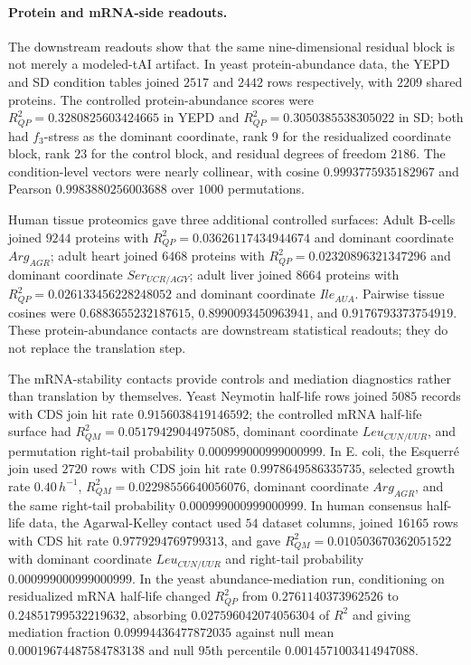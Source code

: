 \paragraph{Protein and mRNA-side readouts.}
The downstream readouts show that the same nine-dimensional residual block is not merely a modeled-tAI artifact.  In yeast protein-abundance data, the YEPD and SD condition tables joined $2517$ and $2442$ rows respectively, with $2209$ shared proteins.  The controlled protein-abundance scores were $R^2_{QP}=0.3280825603424665$ in YEPD and $R^2_{QP}=0.3050385538305022$ in SD; both had $f_3$-stress as the dominant coordinate, rank $9$ for the residualized coordinate block, rank $23$ for the control block, and residual degrees of freedom $2186$.  The condition-level vectors were nearly collinear, with cosine $0.9993775935182967$ and Pearson $0.9983880256003688$ over $1000$ permutations.

Human tissue proteomics gave three additional controlled surfaces: Adult B-cells joined $9244$ proteins with $R^2_{QP}=0.03626117434944674$ and dominant coordinate $Arg_{AGR}$; adult heart joined $6468$ proteins with $R^2_{QP}=0.02320896321347296$ and dominant coordinate $Ser_{UCR/AGY}$; adult liver joined $8664$ proteins with $R^2_{QP}=0.026133456228248052$ and dominant coordinate $Ile_{AUA}$.  Pairwise tissue cosines were $0.6883655232187615$, $0.8990093450963941$, and $0.9176793373754919$.  These protein-abundance contacts are downstream statistical readouts; they do not replace the translation step.

The mRNA-stability contacts provide controls and mediation diagnostics rather than translation by themselves.  Yeast Neymotin half-life rows joined $5085$ records with CDS join hit rate $0.9156038419146592$; the controlled mRNA half-life surface had $R^2_{QM}=0.05179429044975085$, dominant coordinate $Leu_{CUN/UUR}$, and permutation right-tail probability $0.000999000999000999$.  In E. coli, the Esquerr\'e join used $2720$ rows with CDS join hit rate $0.9978649586335735$, selected growth rate $0.40\,h^{-1}$, $R^2_{QM}=0.02298556640056076$, dominant coordinate $Arg_{AGR}$, and the same right-tail probability $0.000999000999000999$.  In human consensus half-life data, the Agarwal-Kelley contact used $54$ dataset columns, joined $16165$ rows with CDS hit rate $0.9779294769799313$, and gave $R^2_{QM}=0.010503670362051522$ with dominant coordinate $Leu_{CUN/UUR}$ and right-tail probability $0.000999000999000999$.  In the yeast abundance-mediation run, conditioning on residualized mRNA half-life changed $R^2_{QP}$ from $0.2761140373962526$ to $0.24851799532219632$, absorbing $0.027596042074056304$ of $R^2$ and giving mediation fraction $0.09994436477872035$ against null mean $0.00019674487584783138$ and null $95$th percentile $0.0014571003414947088$.


